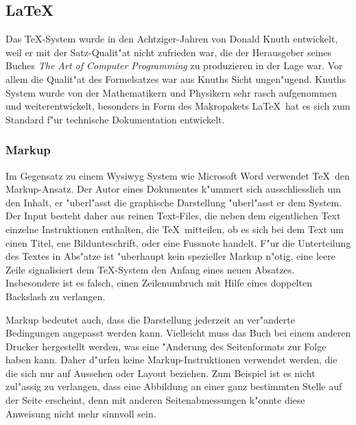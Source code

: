 \documentclass[a4paper,12pt]{article}
\begin{document}
\subsection{\LaTeX}
Das \TeX-System wurde in den Achtziger-Jahren von Donald Knuth entwickelt,
weil er mit der Satz-Qualit"at nicht zufrieden war, die der Herausgeber
seines Buches {\em The Art of Computer Programming} zu produzieren in
der Lage war.
Vor allem die Qualit"at des Formelsatzes war aus Knuths Sicht 
ungen"ugend.
Knuths System wurde von der Mathematikern und Physikern sehr rasch
aufgenommen und weiterentwickelt, besonders in Form des Makropakets
\LaTeX\ hat es sich zum Standard f"ur technische Dokumentation
entwickelt.

\subsubsection{Markup}
Im Gegensatz zu einem Wysiwyg System wie Microsoft Word verwendet
\TeX\ den Markup-Ansatz.
Der Autor eines Dokumentes k"ummert sich ausschliesslich um den Inhalt,
er "uberl"asst die graphische Darstellung "uberl"asst er dem System.
Der Input besteht daher aus reinen Text-Files, die neben dem eigentlichen
Text einzelne Instruktionen enthalten, die \TeX\ mitteilen, ob es sich
bei dem Text um einen Titel, ene Bildunteschrift, oder eine Fussnote
handelt.
F"ur die Unterteilung des Textes in Abs"atze ist "uberhaupt
kein spezieller Markup n"otig, eine leere Zeile signalisiert
dem \TeX-System den Anfang eines neuen Absatzes.
Insbesondere ist es falsch, einen Zeilenumbruch mit Hilfe eines
doppelten Backslash zu verlangen.

Markup bedeutet auch, dass die Darstellung jederzeit an ver"anderte
Bedingungen angepasst werden kann.
Vielleicht muss das Buch bei einem anderen Drucker hergestellt
werden, was eine "Anderung des Seitenformats zur Folge haben kann.
Daher d"urfen keine Markup-Instruktionen verwendet werden, die die
sich nur auf Aussehen oder Layout beziehen.
Zum Beispiel ist es nicht zul"assig zu verlangen, dass eine Abbildung
an einer ganz bestimmten Stelle auf der Seite erscheint, denn mit
anderen Seitenabmessungen k"onnte diese Anweisung nicht mehr sinnvoll
sein.

\end{document}
